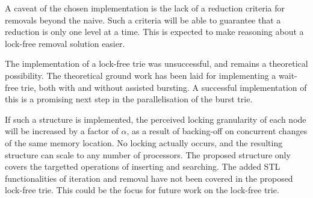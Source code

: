 A caveat of the chosen implementation is the lack of a reduction criteria
for removals beyond the naive. Such a criteria will be able to guarantee
that a reduction is only one level at a time. This is expected to  make
reasoning about a lock-free removal solution easier.

The implementation of a lock-free trie was unsuccessful, and remains a
theoretical possibility. The theoretical ground work has been laid for
implementing a wait-free trie, both with and without assisted bursting.
A successful implementation of this is a promising next step in the
parallelisation of the burst trie.

If such a structure is implemented, the perceived locking granularity of each
node will be increased by a factor of $\alpha$, as a result of backing-off on
concurrent changes of the same memory location. No locking actually occurs,
and the resulting structure can scale to any number of processors.
The proposed structure only covers the targetted operations of inserting
and searching. The added STL functionalities of iteration and removal
have not been covered in the proposed lock-free trie. This could be the
focus for future work on the lock-free trie.

%
%
%
%
%

